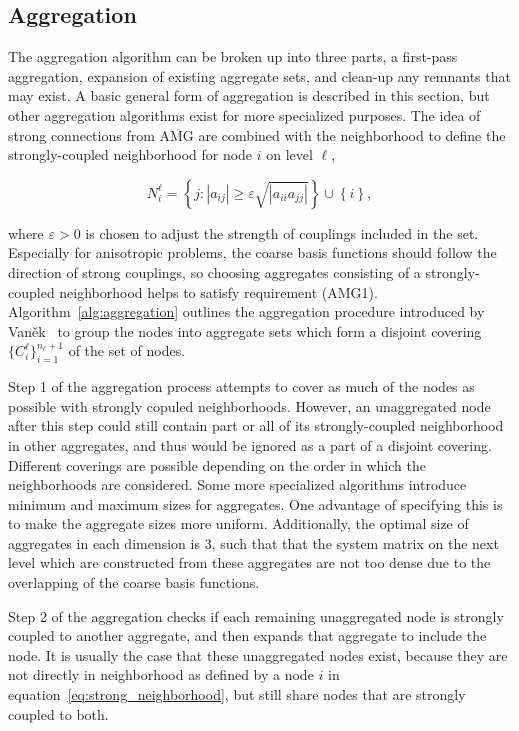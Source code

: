 \subsection{Aggregation}
The aggregation algorithm can be broken up into three parts, a first-pass aggregation, expansion of existing aggregate sets, and clean-up any remnants that may exist. A basic general form of aggregation is described in this section, but other aggregation algorithms exist for more specialized purposes. The idea of strong connections from AMG are combined with the neighborhood to define the strongly-coupled neighborhood for node $i$ on level $\ell$,

\begin{equation}
	\label{eq:strong_neighborhood}
	N_i^\ell = \left\{ j : |a_{ij}| \geq \varepsilon \sqrt{|a_{ii} a_{jj} |} \right\} \cup \left\{ i \right\},
\end{equation}

where $\varepsilon > 0$ is chosen to adjust the strength of couplings included in the set. Especially for anisotropic problems, the coarse basis functions should follow the direction of strong couplings, so choosing aggregates consisting of a strongly-coupled neighborhood helps to satisfy requirement (AMG1). Algorithm~\ref{alg:aggregation} outlines the aggregation procedure introduced by Van\v{e}k~\cite{Vanek1996_unstruc} to group the nodes into aggregate sets which form a disjoint covering $\{C_i^\ell\}_{i=1}^{n_\ell + 1}$ of the set of nodes.

Step 1 of the aggregation process attempts to cover as much of the nodes as possible with strongly copuled neighborhoods. However, an unaggregated node after this step could still contain part or all of its strongly-coupled neighborhood in other aggregates, and thus would be ignored as a part of a disjoint covering. Different coverings are possible depending on the order in which the neighborhoods are considered. Some more specialized algorithms introduce minimum and maximum sizes for aggregates. One advantage of specifying this is to make the aggregate sizes more uniform. Additionally, the optimal size of aggregates in each dimension is 3, such that that the system matrix on the next level which are constructed from these aggregates are not too dense due to the overlapping of the coarse basis functions.

Step 2 of the aggregation checks if each remaining unaggregated node is strongly coupled to another aggregate, and then expands that aggregate to include the node. It is usually the case that these unaggregated nodes exist, because they are not directly in neighborhood as defined by a node $i$ in equation~\ref{eq:strong_neighborhood}, but still share nodes that are strongly coupled to both.

